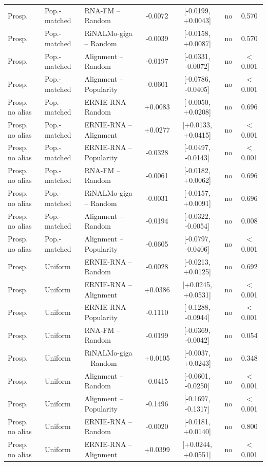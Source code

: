 {\begin{longtable}{lllcccc}
Prosp. & Pop.-matched & RNA-FM -- Random & -0.0072 & [-0.0199, +0.0043] & no & 0.570\\
Prosp. & Pop.-matched & RiNALMo-giga -- Random & -0.0039 & [-0.0158, +0.0087] & no & 0.570\\
Prosp. & Pop.-matched & Alignment -- Random & -0.0197 & [-0.0331, -0.0072] & no & $<$0.001\\
Prosp. & Pop.-matched & Alignment -- Popularity & -0.0601 & [-0.0786, -0.0405] & no & $<$0.001\\
\midrule
Prosp. no alias & Pop.-matched & ERNIE-RNA -- Random & +0.0083 & [-0.0050, +0.0208] & no & 0.696\\
Prosp. no alias & Pop.-matched & ERNIE-RNA -- Alignment & +0.0277 & [+0.0133, +0.0415] & no & $<$0.001\\
Prosp. no alias & Pop.-matched & ERNIE-RNA -- Popularity & -0.0328 & [-0.0497, -0.0143] & no & $<$0.001\\
Prosp. no alias & Pop.-matched & RNA-FM -- Random & -0.0061 & [-0.0182, +0.0062] & no & 0.696\\
Prosp. no alias & Pop.-matched & RiNALMo-giga -- Random & -0.0031 & [-0.0157, +0.0091] & no & 0.696\\
Prosp. no alias & Pop.-matched & Alignment -- Random & -0.0194 & [-0.0322, -0.0054] & no & 0.008\\
Prosp. no alias & Pop.-matched & Alignment -- Popularity & -0.0605 & [-0.0797, -0.0406] & no & $<$0.001\\
\midrule
Prosp. & Uniform & ERNIE-RNA -- Random & -0.0028 & [-0.0213, +0.0125] & no & 0.692\\
Prosp. & Uniform & ERNIE-RNA -- Alignment & +0.0386 & [+0.0245, +0.0531] & no & $<$0.001\\
Prosp. & Uniform & ERNIE-RNA -- Popularity & -0.1110 & [-0.1288, -0.0944] & no & $<$0.001\\
Prosp. & Uniform & RNA-FM -- Random & -0.0199 & [-0.0369, -0.0042] & no & 0.054\\
Prosp. & Uniform & RiNALMo-giga -- Random & +0.0105 & [-0.0037, +0.0243] & no & 0.348\\
Prosp. & Uniform & Alignment -- Random & -0.0415 & [-0.0601, -0.0250] & no & $<$0.001\\
Prosp. & Uniform & Alignment -- Popularity & -0.1496 & [-0.1697, -0.1317] & no & $<$0.001\\
\midrule
Prosp. no alias & Uniform & ERNIE-RNA -- Random & -0.0020 & [-0.0181, +0.0140] & no & 0.800\\
Prosp. no alias & Uniform & ERNIE-RNA -- Alignment & +0.0399 & [+0.0244, +0.0551] & no & $<$0.001\\

\end{longtable}}
